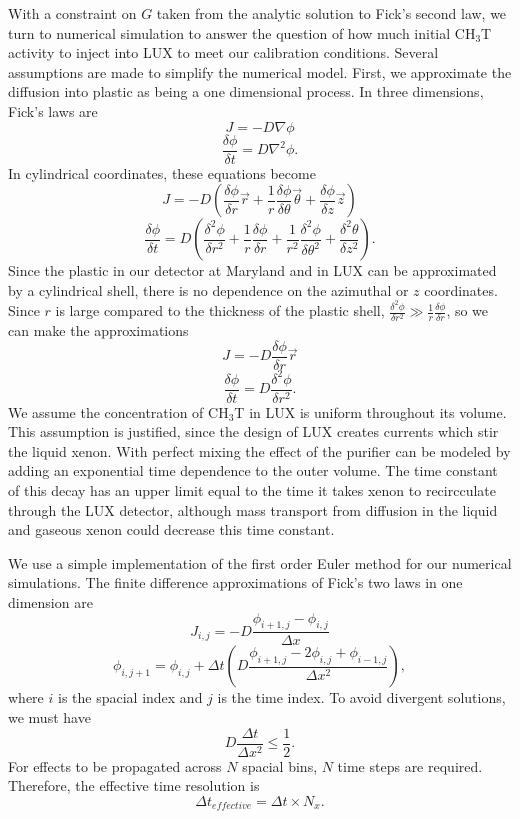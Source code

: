 With a constraint on $G$ taken from the analytic solution to Fick's second law, we turn to numerical simulation to answer the question of how much initial CH$_3$T activity to inject into LUX to meet our calibration conditions.  Several assumptions are made to simplify the numerical model.  First, we approximate the diffusion into plastic as being a one dimensional process. In three dimensions, Fick's laws are
\[J=-D\nabla \phi\]
\[\frac{\delta\phi}{\delta t} = D \nabla^2 \phi .\]
In cylindrical coordinates, these equations become
\[J = -D (\frac{\delta \phi}{\delta r} \vec{r} + \frac{1}{r}\frac{\delta \phi}{\delta \theta}\vec{\theta} + \frac{\delta \phi}{\delta z}\vec{z})\]
\[\frac{\delta \phi}{\delta t} = D ( \frac{\delta^2\phi}{\delta r^2} + \frac{1}{r}\frac{\delta \phi}{\delta r} + \frac{1}{r^2}\frac{\delta^2 \phi}{\delta \theta^2} + \frac{\delta^2 \theta}{\delta z^2}).\]
Since the plastic in our detector at Maryland and in LUX can be approximated by a cylindrical shell, there is no dependence on the azimuthal or $z$ coordinates.  Since $r$ is large compared to the thickness of the plastic shell, $\frac{\delta^2 \phi}{\delta r^2} \gg \frac{1}{r} \frac {\delta \phi}{\delta r}$, so we can make the approximations
\[J=-D\frac{\delta \phi}{\delta r}\vec{r}\]
\[\frac{\delta \phi}{\delta t} = D \frac{\delta^2 \phi}{\delta r^2}.\]  We assume the concentration of CH$_3$T in LUX is uniform throughout its volume.  This assumption is justified, since the design of LUX creates currents which stir the liquid xenon.  With perfect mixing the effect of the purifier can be modeled by adding an exponential time dependence to the outer volume.  The time constant of this decay has an upper limit equal to the time it takes xenon to recircculate through the LUX detector, although mass transport from diffusion in the liquid and gaseous xenon could decrease this time constant. 

We use a simple implementation of the first order Euler method for our numerical simulations.  The finite difference approximations of Fick's two laws in one dimension are 
\[J_{i,j} = -D \frac{\phi_{i+1,j}-\phi_{i,j}}{\Delta x }\]
\[\phi_{i,j+1} = \phi_{i,j} + \Delta t (D \frac{\phi_{i+1,j} - 2 \phi_{i,j} + \phi_{i-1,j}}{\Delta x^2}),\]
where $i$ is the spacial index and $j$ is the time index.  To avoid divergent solutions, we must have
\[D \frac{\Delta t}{\Delta x^2} \leq \frac{1}{2}.\]
For effects to be propagated across $N$ spacial bins, $N$ time steps are required.  Therefore, the effective time resolution is
\[\Delta t_{effective} = \Delta t \times N_x.\]


